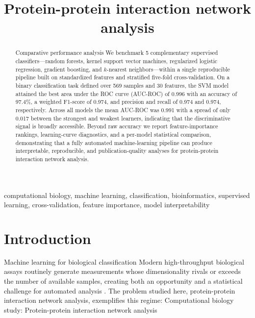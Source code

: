 \documentclass[conference]{IEEEtran}
\begin{document}
\title{Protein-protein interaction network analysis}

\author{
}

\maketitle

\begin{abstract}
Comparative performance analysis We benchmark 5 complementary supervised classifiers---random forests,
kernel support vector machines, regularized logistic regression, gradient boosting, and
$k$-nearest neighbors---within a single reproducible pipeline built on standardized features
and stratified five-fold cross-validation. On a binary classification task defined over
569 samples and 30 features, the SVM model attained the best
area under the ROC curve (AUC-ROC) of 0.996 with an accuracy of 97.4\%,
a weighted F1-score of 0.974, and precision and recall of 0.974 and 0.974,
respectively. Across all models the mean AUC-ROC was 0.991 with a spread of only
0.017 between the strongest and weakest learners, indicating that the discriminative
signal is broadly accessible. Beyond raw accuracy we report feature-importance rankings,
learning-curve diagnostics, and a per-model statistical comparison, demonstrating that a
fully automated machine-learning pipeline can produce interpretable, reproducible, and
publication-quality analyses for protein-protein interaction network analysis.
\end{abstract}

\begin{IEEEkeywords}
computational biology, machine learning, classification, bioinformatics, supervised learning,
cross-validation, feature importance, model interpretability
\end{IEEEkeywords}

\section{Introduction}
\label{sec:intro}
Machine learning for biological classification Modern high-throughput biological assays routinely generate measurements whose
dimensionality rivals or exceeds the number of available samples, creating both an opportunity
and a statistical challenge for automated analysis \cite{libbrecht2015machine}. The problem
studied here, protein-protein interaction network analysis, exemplifies this regime: Computational biology study: Protein-protein interaction network analysis
\end{document}
